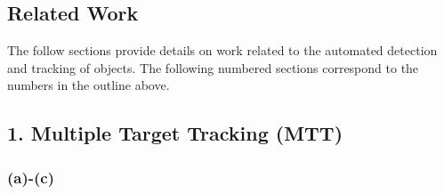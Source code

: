 \documentclass{article}
\begin{document}
\subsection*{Related Work}
\vspace{6pt}
The follow sections provide details on work related to the automated detection and tracking of objects. The following numbered sections correspond to the numbers in the outline above.




\subsection*{1. Multiple Target Tracking (MTT)}

\subsubsection*{(a)-(c)}
\end{document}
